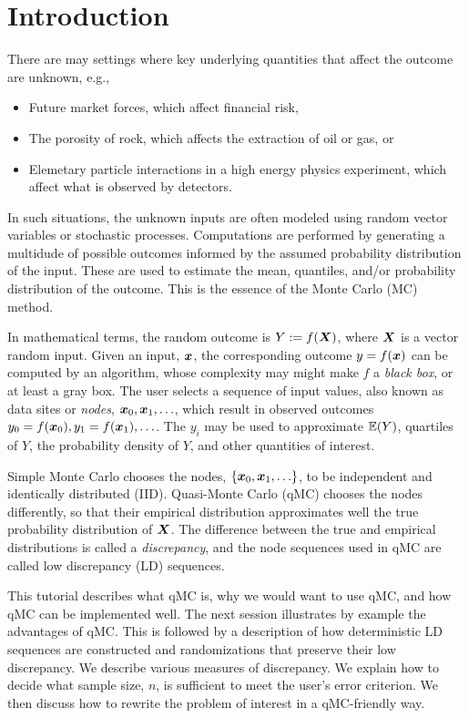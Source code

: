 \documentclass{svproc}
\newcounter{algorithm}%
\begin{document}
\section{Introduction} \label{sec:intro}
There are may settings where key underlying quantities that affect the outcome are unknown, e.g.,
\begin{itemize}
	\item Future market forces, which affect financial risk,
	\item The porosity of rock, which affects the extraction of oil or gas, or
	\item Elemetary particle interactions in a high energy physics experiment, which affect what is observed by detectors.
\end{itemize}
In such situations, the unknown inputs are often modeled using random vector variables or stochastic processes.  Computations are performed by generating a multidude of possible outcomes informed by the assumed probability distribution of the input. These are used to estimate the mean, quantiles, and/or probability distribution of the outcome.  This is the essence of the Monte Carlo (MC) method.

In mathematical terms, the random outcome is $Y := f({\boldsymbol{X}})$, where ${\boldsymbol{X}}$ is a vector random input.  Given an input, ${\boldsymbol{x}}$, the corresponding outcome  $y = f({\boldsymbol{x}})$ can be computed by an algorithm, whose complexity may might make $f$ a \emph{black box}, or at least a gray box.  The user selects a sequence of input values, also known as data sites or \emph{nodes}, ${\boldsymbol{x}}_0, {\boldsymbol{x}}_1, \ldots$, which result in observed outcomes $y_0 = f({\boldsymbol{x}}_0), y_1 = f({\boldsymbol{x}}_1), \ldots$.  The $y_i$ may be used to approximate ${\mathbb{E}}(Y)$, quartiles of $Y$, the probability density of $Y$, and other quantities of interest.

Simple  Monte Carlo chooses the nodes, $\{{\boldsymbol{x}}_0, {\boldsymbol{x}}_1, \ldots\}$, to be independent and identically distributed (IID).  Quasi-Monte Carlo (qMC)  chooses the nodes differently, so that their empirical distribution approximates well the true probability distribution of ${\boldsymbol{X}}$.  The difference between  the true and empirical distributions is called a \emph{discrepancy}, and the node sequences used in qMC are called low discrepancy (LD) sequences.

This tutorial describes what qMC is, why we would want to use qMC, and how qMC can be implemented well.  The next session illustrates by example the advantages of qMC.  This is followed by a description of how deterministic LD sequences are constructed and randomizations that preserve their low discrepancy.  We describe various measures of discrepancy.  We explain how to decide what sample size, $n$, is sufficient to meet the user's error criterion.  We then discuss how to rewrite the problem of interest in a qMC-friendly way.
\end{document}
